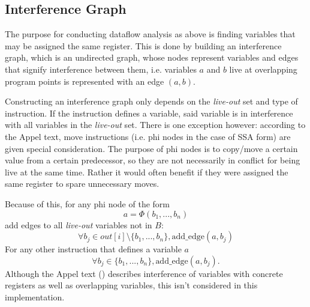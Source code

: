 \documentclass{article}
\begin{document}
\subsection{Interference Graph}

The purpose for conducting dataflow analysis as above is finding variables that may be assigned the same register. This is done by building an interference graph, which is an undirected graph, whose nodes represent variables and edges that signify interference between them, i.e. variables \(a\) and \(b\) live at overlapping program points is represented with an edge \((a,b)\).


Constructing an interference graph only depends on the \textit{live-out} set and type of instruction. If the instruction defines a variable, said variable is in interference with all variables in the \textit{live-out} set. There is one exception however: according to the Appel text, move instructions (i.e. phi nodes in the case of SSA form) are given special consideration. The purpose of phi nodes is to copy/move a certain value from a certain predecessor, so they are not necessarily in conflict for being live at the same time. Rather it would often benefit if they were assigned the same register to spare unnecessary moves. %


Because of this, for any phi node of the form 
\[
  a = \Phi (b_1, ..., b_n)
\]
add edges to all \textit{live-out} variables not in \(B\):
\[
  \forall b_j \in \mathit{out}[i] \setminus \{b_1, ..., b_n\}, \text{add\_edge}(a, b_j)
\]
For any other instruction that defines a variable \(a\)
\[
  \forall b_j \in \{b_1, ..., b_n\}, \text{add\_edge}(a, b_j).
\]
Although the Appel text (\cite{tiger}) describes interference of variables with concrete registers as well as overlapping variables, this isn't considered in this implementation.






\end{document}
